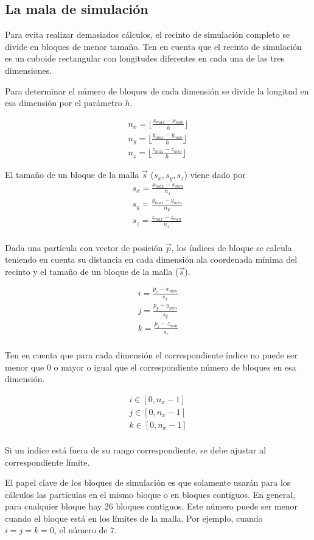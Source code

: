 \subsection{La mala de simulación}

Para evita realizar demasiados cálculos, el recinto de simulación completo se
divide en bloques de menor tamaño. Ten en cuenta que el recinto de simulación es
un cuboide rectangular con longitudes diferentes en cada una de las tres
dimensiones.

Para determinar el número de bloques de cada dimensión se divide la longitud en
esa dimensión por el parámetro $h$.

\[
\begin{split}
n_x = \lfloor \frac{x_{max}- x_{min}}{h} \rfloor\\
n_y = \lfloor \frac{y_{max}- y_{min}}{h} \rfloor\\
n_z = \lfloor \frac{z_{max}- z_{min}}{h} \rfloor
\end{split}
\]

El tamaño de un bloque de la malla $\vec{s}$ ($s_x, s_y, s_z$) viene dado por
\[
\begin{split}
s_x = \frac{x_{max} - x_{min}}{n_x}\\
s_y = \frac{y_{max} - y_{min}}{n_y}\\
s_z = \frac{z_{max} - z_{min}}{n_z}\\
\end{split}
\] 

Dada una partícula con vector de posición $\vec{p}$, los índices de bloque se
calcula teniendo en cuenta su distancia en cada dimensión ala coordenada mínima
del recinto y el tamaño de un bloque de la malla ($\vec{s}$).

\[
\begin{split}
i = \frac{p_x - x_{min}}{s_x}\\
j = \frac{p_y - y_{min}}{s_y}\\
k = \frac{p_z - z_{min}}{s_z}\\
\end{split}
\]

Ten en cuenta que para cada dimensión el correspondiente índice no puede ser
menor que $0$ o mayor o igual que el correspondiente número de bloques en esa
dimensión.

\[
\begin{split}
i \in [0, n_x-1]\\
j \in [0, n_x-1]\\
k \in [0, n_x-1]\\
\end{split}
\]

Si un índice está fuera de su rango correspondiente, se debe ajustar al
correspondiente límite.

El papel clave de los bloques de simulación es que solamente usarán para los
cálculos las partículas en el mismo bloque o en bloques contiguos. En general,
para cualquier bloque hay 26 bloques contiguos. Este número puede ser menor
cuando el bloque está en los límites de la malla. Por ejemplo, cuando $i=j=k=0$,
el número de 7.
